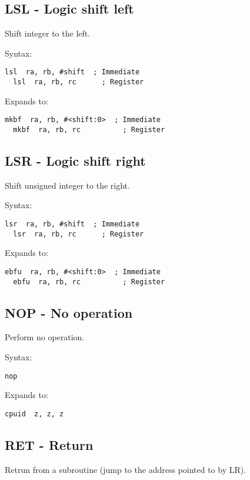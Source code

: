 \subsection{LSL - Logic shift left}

Shift integer to the left.

Syntax:
\begin{lstlisting}[style=assembler]
  lsl  ra, rb, #shift  ; Immediate
  lsl  ra, rb, rc      ; Register
\end{lstlisting}

Expands to:
\begin{lstlisting}[style=assembler]
  mkbf  ra, rb, #<shift:0>  ; Immediate
  mkbf  ra, rb, rc          ; Register
\end{lstlisting}

\subsection{LSR - Logic shift right}

Shift unsigned integer to the right.

Syntax:
\begin{lstlisting}[style=assembler]
  lsr  ra, rb, #shift  ; Immediate
  lsr  ra, rb, rc      ; Register
\end{lstlisting}

Expands to:
\begin{lstlisting}[style=assembler]
  ebfu  ra, rb, #<shift:0>  ; Immediate
  ebfu  ra, rb, rc          ; Register
\end{lstlisting}

\subsection{NOP - No operation}

Perform no operation.

Syntax:
\begin{lstlisting}[style=assembler]
  nop
\end{lstlisting}

Expands to:
\begin{lstlisting}[style=assembler]
  cpuid  z, z, z
\end{lstlisting}

\subsection{RET - Return}

Retrun from a subroutine (jump to the address pointed to by LR).

